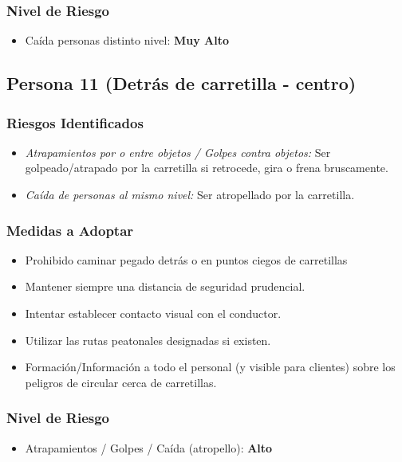 \documentclass[12pt,a4paper]{article}
\begin{document}
	\subsubsection{Nivel de Riesgo}
	\begin{itemize}
		\item Caída personas distinto nivel: \textbf{Muy Alto}
	\end{itemize}
	
	\bigskip\hrulefill\bigskip
	
	\subsection{Persona 11 (Detrás de carretilla - centro)}
	
	\subsubsection{Riesgos Identificados}
	\begin{itemize}
		\item \textit{Atrapamientos por o entre objetos / Golpes contra objetos:} Ser golpeado/atrapado por la carretilla si retrocede, gira o frena bruscamente.
		\item \textit{Caída de personas al mismo nivel:} Ser atropellado por la carretilla.
	\end{itemize}
	
	\subsubsection{Medidas a Adoptar}
	\begin{itemize}
		\item Prohibido caminar pegado detrás o en puntos ciegos de carretillas
		\item Mantener siempre una distancia de seguridad prudencial.
		\item Intentar establecer contacto visual con el conductor.
		\item Utilizar las rutas peatonales designadas si existen.
		\item Formación/Información a todo el personal (y visible para clientes) sobre los peligros de circular cerca de carretillas.
	\end{itemize}
	
	\subsubsection{Nivel de Riesgo}
	\begin{itemize}
		\item Atrapamientos / Golpes / Caída (atropello): \textbf{Alto}
	\end{itemize}
	
\end{document}
